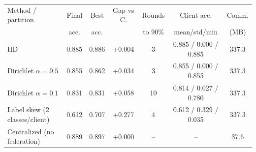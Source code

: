 \setlength{\tabcolsep}{4pt}\begin{tabular}{lcccccc}
\toprule
Method / partition & Final & Best & Gap vs C. & Rounds & Client acc. & Comm. \\
 & acc. & acc. & & to 90\% & mean/std/min & (MB) \\
\midrule
IID & 0.885 & 0.886 & +0.004 & 3 & 0.885 / 0.000 / 0.885 & 337.3 \\
Dirichlet $\alpha=0.5$ & 0.855 & 0.862 & +0.034 & 3 & 0.855 / 0.000 / 0.855 & 337.3 \\
Dirichlet $\alpha=0.1$ & 0.831 & 0.831 & +0.058 & 10 & 0.814 / 0.027 / 0.780 & 337.3 \\
Label skew (2 classes/client) & 0.612 & 0.707 & +0.277 & 4 & 0.612 / 0.329 / 0.035 & 337.3 \\
Centralized (no federation) & 0.889 & 0.897 & +0.000 & -- & -- & 37.6 \\
\bottomrule
\end{tabular}
